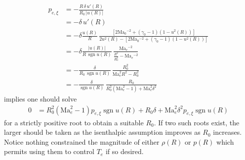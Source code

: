 \documentclass[letterpaper,11pt,nointlimits,reqno]{amsart}
\newcommand{\Mach}[1][]{\mbox{Ma}_{#1}}
\begin{document}
\begin{align}
  p_{e,\xi}
  &=
  - \frac{R \, \delta \, u'\!\left(R\right)}{R_0 \, \left|u\!\left(R\right)\right|}
\\&=
  - \delta \, u'\!\left(R\right)
\\&=
  - \delta
  \frac{u\!\left(R\right)}{R}
       \,
       \frac{
         \left[
             2 \Mach[0]{}^{-2} + \left(\gamma_0-1\right) \left(1 - u^2\!\left(R\right)\right)
         \right]
       }{
           2 u^2\!\left(R\right)
         - \left[
             2 \Mach[0]{}^{-2} + \left(\gamma_0-1\right) \left(1 - u^2\!\left(R\right)\right)
           \right]
       }
\\&=
  - \delta
  \frac{\left|u\!\left(R\right)\right|}{R \, \operatorname{sgn} u\!\left(R\right)}
       \,
       \frac{
           \Mach[e]{}^{-2}
       }{
           \frac{R^2}{R_0^2}
         - \Mach[e]{}^{-2}
       }
\\&=
  -
  \frac{\delta}{R_0 \, \operatorname{sgn} u\!\left(R\right)}
       \,
       \frac{ R_0^2 }{ \Mach[e]^2 R^2 - R_0^2 }
\\&=
  -
  \frac{\delta}{\operatorname{sgn} u\!\left(R\right)}
       \,
       \frac{ R_0 }{ R_0^2 \left(\Mach[e]^2 - 1\right) + \Mach[e]^2 \delta^2 }
\end{align}
implies one should solve
\begin{align}
  0
  &=
    R_0^2
    \left(\Mach[e]^2 - 1\right) p_{e,\xi} \operatorname{sgn} u\!\left(R\right)
  + R_0
    \delta
  + \Mach[e]^2 \delta^2 p_{e,\xi} \operatorname{sgn} u\!\left(R\right)
\end{align}
for a strictly positive root to obtain a suitable $R_0$.  If two such roots
exist, the larger should be taken as the isenthalpic assumption improves as
$R_0$ increases.  Notice nothing constrained the magnitude of either
$\rho\!\left(R\right)$ or $p\!\left(R\right)$ which permits using them to
control $T_e$ if so desired.
\end{document}
